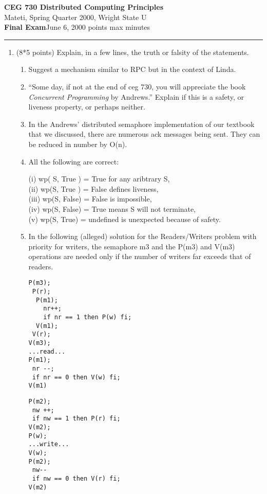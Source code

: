 \documentclass[12pt]{article}
\begin{document}
{\bf CEG 
\large \bf 730 Distributed Computing Principles}\\[5pt]
{Mateti,  Spring Quarter 2000, Wright State U}\\
{\bf Final Exam}\quad June 6, 2000  points max  minutes\\
\hrule

\begin{enumerate}

\item (8*5 points)
Explain, in a few lines, the truth or falsity of the statements.

\begin{enumerate}

\item Suggest a mechanism similar to RPC but in the context of Linda.

\item ``Some day, if not at the end of {\sc ceg} 730, you will
appreciate the book {\em Concurrent Programming} by Andrews.''
Explain if this is a safety, or liveness property, or perhaps neither.

\item In the Andrews' distributed semaphore implementation of our
textbook that we discussed, there are numerous {\sc ack} messages
being sent.  They can be reduced in number by O(n).

\item All the following are correct:

(i) wp( S, True ) = True  for any aribtrary S,\\
(ii) wp(S, True ) = False defines liveness,\\
(iii) wp(S, False) = False is impossible,\\
(iv) wp(S, False)  = True means S will not terminate,\\
(v) wp(S, True) = undefined is unexpected because of  safety.

\item In the following (alleged) solution for the Readers/Writers
problem with priority for writers, the semaphore m3 and the P(m3) and
V(m3) operations are needed only if the number of writers far exceeds
that of readers.

\begin{minipage}[t]{2.5in}
\begin{verbatim}
P(m3);
 P(r);
  P(m1);
    nr++;
    if nr == 1 then P(w) fi;
  V(m1);
 V(r);
V(m3);
...read...
P(m1);
 nr --;
 if nr == 0 then V(w) fi;
V(m1)
\end{verbatim}
\end{minipage}\vline\quad
\begin{minipage}[t]{2in}
\begin{verbatim}
P(m2);
 nw ++;
 if nw == 1 then P(r) fi;
V(m2);
P(w);
...write...
V(w);
P(m2);
 nw--
 if nw == 0 then V(r) fi;
V(m2)
\end{verbatim}
\end{minipage}


\end{enumerate}
\end{enumerate}
\end{document}
